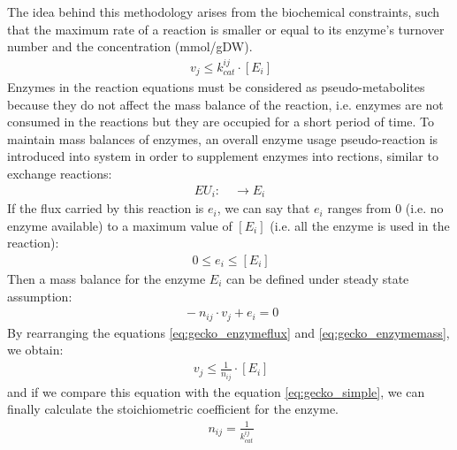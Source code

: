 The idea behind this methodology arises from the biochemical constraints, such that the maximum rate of a reaction is smaller or equal to its enzyme's turnover number and the concentration (mmol/gDW).
\begin{align}
 \label{eq:gecko_simple}
 \ v_{j} \leq k_{cat}^{ij} \cdot [E_{i}]
\end{align}
Enzymes in the reaction equations must be considered as pseudo-metabolites because they do not affect the mass balance of the reaction, i.e. enzymes are not consumed in the reactions but they are occupied for a short period of time. To maintain mass balances of enzymes, an overall enzyme usage pseudo-reaction is introduced into system in order to supplement enzymes into rections, similar to exchange reactions:
\begin{align}
 \label{eq:gecko_suppelement}
 \  EU_i: \quad \to E_i
 \
\end{align}
If the flux carried by this reaction is $e_i$, we can say that $e_i$ ranges from 0 (i.e. no enzyme available) to a maximum value of $[E_i]$ (i.e. all the enzyme is used in the reaction):
\begin{align}
 \label{eq:gecko_enzymeflux}
 \  0 \leq e_i \leq [E_i]
\end{align}
Then a mass balance for the enzyme $E_i$ can be defined under steady state assumption:
\begin{align}
 \label{eq:gecko_enzymemass}
 \  -n_{ij} \cdot v_j + e_i = 0
\end{align}
By rearranging the equations \ref{eq:gecko_enzymeflux} and \ref{eq:gecko_enzymemass}, we obtain:
\begin{align}
 \label{eq:gecko_enzymemassrearranged}
 \ v_j \leq \frac{1}{n_{ij}} \cdot [E_i]
\end{align}
and if we compare this equation with the equation \ref{eq:gecko_simple}, we can finally calculate the stoichiometric coefficient for the enzyme.
\begin{align}
 \label{eq:gecko_enzymestoichiometry}
 \ n_{ij}=\frac{1}{k_{cat}^{ij}}
\end{align}

